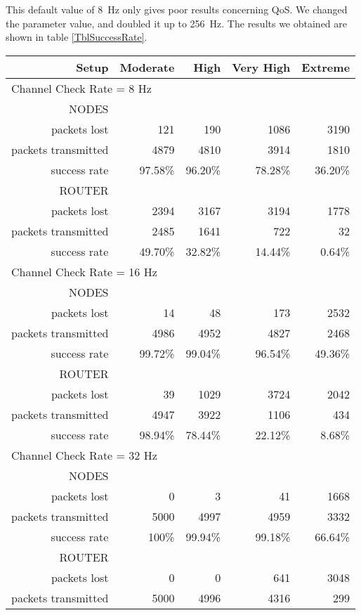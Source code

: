 \documentclass[a4paper,twoside]{article}
\begin{document}
This default value of 8~Hz only gives poor results concerning QoS.
We changed the parameter value, and doubled it up to 256~Hz. The results
we obtained are shown in table \ref{TblSuccessRate}.

\begin{table*}[htbp]
\centering
\begin{tabular}{|r|r|r|r|r|}
\hline
Setup & Moderate & High & Very High & Extreme \\
\hline
\multicolumn{5}{|l|}{Channel Check Rate = 8 Hz}\\
\hline
NODES & & & & \\
packets lost & 121 & 190 & 1086 & 3190 \\
packets transmitted & 4879 & 4810 & 3914 & 1810 \\
success rate & 97.58\% & 96.20\% & 78.28\% & 36.20\% \\
ROUTER & & & & \\
packets lost & 2394 & 3167 & 3194 & 1778 \\
packets transmitted & 2485 & 1641 & 722 & 32 \\
success rate & 49.70\% & 32.82\% & 14.44\% & 0.64\% \\
\hline
\multicolumn{5}{|l|}{Channel Check Rate = 16 Hz}\\
\hline
NODES & & & & \\
packets lost & 14 & 48 & 173 & 2532 \\
packets transmitted & 4986 & 4952 & 4827 & 2468 \\
success rate & 99.72\% & 99.04\% & 96.54\% & 49.36\% \\
ROUTER & & & & \\
packets lost & 39 & 1029 & 3724 & 2042 \\
packets transmitted & 4947 & 3922 & 1106 & 434 \\
success rate & 98.94\% & 78.44\% & 22.12\% & 8.68\% \\
\hline
\multicolumn{5}{|l|}{Channel Check Rate = 32 Hz}\\
\hline
NODES & & & & \\
packets lost & 0 & 3 & 41 & 1668 \\
packets transmitted & 5000 & 4997 & 4959 & 3332 \\
success rate & 100\% & 99.94\% & 99.18\% & 66.64\% \\
ROUTER & & & & \\
packets lost & 0 & 0 & 641 & 3048 \\
packets transmitted & 5000 & 4996 & 4316 & 299 \\

\end{tabular}
\end{table*}
\end{document}
